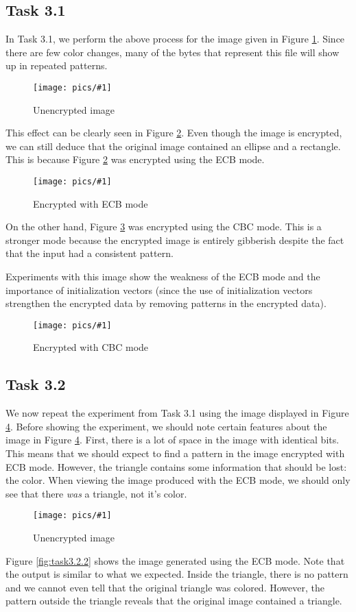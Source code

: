 \documentclass[11pt]{article}
\newcommand{\fig}[2]{ 
\begin{figure}[h]
	\centering
	\caption{#2}
	\texttt{[image: pics/\#1]}
	\label{fig:#1}
\end{figure} 
}
\begin{document}
\subsection*{Task 3.1}

In Task 3.1, we perform the above process for the image given in Figure \ref{fig:task3.1.1}. Since there are few color changes, many of the bytes that represent this file will show up in repeated patterns.

\fig{task3.1.1}{Unencrypted image}

This effect can be clearly seen in Figure \ref{fig:task3.1.2}. Even though the image is encrypted, we can still deduce that the original image contained an ellipse and a rectangle. This is because Figure \ref{fig:task3.1.2} was encrypted using the ECB mode.

\fig{task3.1.2}{Encrypted with ECB mode}

On the other hand, Figure \ref{fig:task3.1.3} was encrypted using the CBC mode. This is a stronger mode because the encrypted image is entirely gibberish despite the fact that the input had a consistent pattern.

Experiments with this image show the weakness of the ECB mode and the importance of initialization vectors (since the use of initialization vectors strengthen the encrypted data by removing patterns in the encrypted data). 

\fig{task3.1.3}{Encrypted with CBC mode}

\newpage
\subsection*{Task 3.2}

We now repeat the experiment from Task 3.1 using the image displayed in Figure \ref{fig:task3.2.1}. Before showing the experiment, we should note certain features about the image in Figure \ref{fig:task3.2.1}. First, there is a lot of space in the image with identical bits. This means that we should expect to find a pattern in the image encrypted with ECB mode. However, the triangle contains some information that should be lost: the color. When viewing the image produced with the ECB mode, we should only see that there \textit{was} a triangle, not it's color.

\fig{task3.2.1}{Unencrypted image}

Figure \ref{fig:task3.2.2} shows the image generated using the ECB mode. Note that the output is similar to what we expected. Inside the triangle, there is no pattern and we cannot even tell that the original triangle was colored. However, the pattern outside the triangle reveals that the original image contained a triangle.
\end{document}
